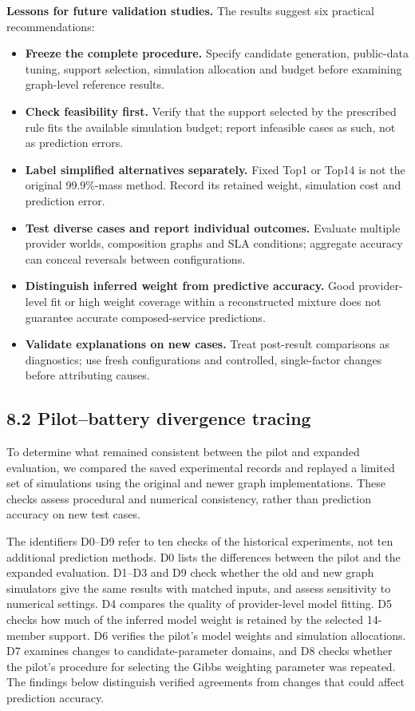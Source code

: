 \documentclass[10pt,a4paper]{article}
\begin{document}
\textbf{Lessons for future validation studies.} The results suggest six practical recommendations:
\begin{itemize}
\item \textbf{Freeze the complete procedure.} Specify candidate generation, public-data tuning, support selection, simulation allocation and budget before examining graph-level reference results.
\item \textbf{Check feasibility first.} Verify that the support selected by the prescribed rule fits the available simulation budget; report infeasible cases as such, not as prediction errors.
\item \textbf{Label simplified alternatives separately.} Fixed Top1 or Top14 is not the original 99.9\%-mass method. Record its retained weight, simulation cost and prediction error.
\item \textbf{Test diverse cases and report individual outcomes.} Evaluate multiple provider worlds, composition graphs and SLA conditions; aggregate accuracy can conceal reversals between configurations.
\item \textbf{Distinguish inferred weight from predictive accuracy.} Good provider-level fit or high weight coverage within a reconstructed mixture does not guarantee accurate composed-service predictions.
\item \textbf{Validate explanations on new cases.} Treat post-result comparisons as diagnostics; use fresh configurations and controlled, single-factor changes before attributing causes.
\end{itemize}

\subsection*{8.2 Pilot--battery divergence tracing}

To determine what remained consistent between the pilot and expanded evaluation, we compared the saved experimental records and replayed a limited set of simulations using the original and newer graph implementations. These checks assess procedural and numerical consistency, rather than prediction accuracy on new test cases.

The identifiers D0--D9 refer to ten checks of the historical experiments, not ten additional prediction methods. D0 lists the differences between the pilot and the expanded evaluation. D1--D3 and D9 check whether the old and new graph simulators give the same results with matched inputs, and assess sensitivity to numerical settings. D4 compares the quality of provider-level model fitting. D5 checks how much of the inferred model weight is retained by the selected 14-member support. D6 verifies the pilot's model weights and simulation allocations. D7 examines changes to candidate-parameter domains, and D8 checks whether the pilot's procedure for selecting the Gibbs weighting parameter was repeated. The findings below distinguish verified agreements from changes that could affect prediction accuracy.
\end{document}
